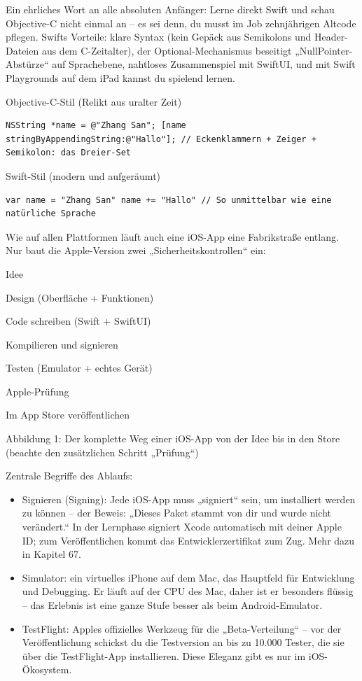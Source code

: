 Ein ehrliches Wort an alle absoluten Anfänger: Lerne direkt Swift und schau Objective-C nicht einmal an – es sei denn, du musst im Job zehnjährigen Altcode pflegen. Swifts Vorteile: klare Syntax (kein Gepäck aus Semikolons und Header-Dateien aus dem C-Zeitalter), der Optional-Mechanismus beseitigt „NullPointer-Abstürze“ auf Sprachebene, nahtloses Zusammenspiel mit SwiftUI, und mit Swift Playgrounds auf dem iPad kannst du spielend lernen.

Objective-C-Stil (Relikt aus uralter Zeit)

\begin{lstlisting}
NSString *name = @"Zhang San"; [name stringByAppendingString:@"Hallo"]; // Eckenklammern + Zeiger + Semikolon: das Dreier-Set
\end{lstlisting}

Swift-Stil (modern und aufgeräumt)

\begin{lstlisting}
var name = "Zhang San" name += "Hallo" // So unmittelbar wie eine natürliche Sprache
\end{lstlisting}


Wie auf allen Plattformen läuft auch eine iOS-App eine Fabrikstraße entlang. Nur baut die Apple-Version zwei „Sicherheitskontrollen“ ein:

Idee

Design (Oberfläche + Funktionen)

Code schreiben (Swift + SwiftUI)

Kompilieren und signieren

Testen (Emulator + echtes Gerät)

Apple-Prüfung

Im App Store veröffentlichen

\begin{center}\small\color{gray}Abbildung 1: Der komplette Weg einer iOS-App von der Idee bis in den Store (beachte den zusätzlichen Schritt „Prüfung“)\end{center}

Zentrale Begriffe des Ablaufs:

\begin{itemize}
  \item Signieren (Signing): Jede iOS-App muss „signiert“ sein, um installiert werden zu können – der Beweis: „Dieses Paket stammt von dir und wurde nicht verändert.“ In der Lernphase signiert Xcode automatisch mit deiner Apple ID; zum Veröffentlichen kommt das Entwicklerzertifikat zum Zug. Mehr dazu in Kapitel 67.
  \item Simulator: ein virtuelles iPhone auf dem Mac, das Hauptfeld für Entwicklung und Debugging. Er läuft auf der CPU des Mac, daher ist er besonders flüssig – das Erlebnis ist eine ganze Stufe besser als beim Android-Emulator.
  \item TestFlight: Apples offizielles Werkzeug für die „Beta-Verteilung“ – vor der Veröffentlichung schickst du die Testversion an bis zu 10.000 Tester, die sie über die TestFlight-App installieren. Diese Eleganz gibt es nur im iOS-Ökosystem.
\end{itemize}

